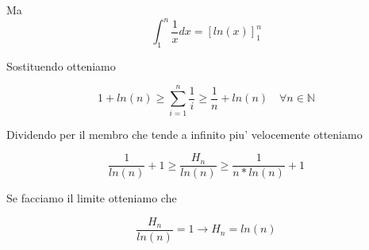 \documentclass{article}
\begin{document}
        Ma
        \begin{equation*}
          \int^n_1 \frac{1}{x}dx=[ln(x)]^n_1
        \end{equation*}
        \begin{flushleft}
          Sostituendo otteniamo 
        \end{flushleft}
        \begin{equation*}
          1+ln(n) \geq \sum_{i=1}^n \frac{1}{i} \geq \frac{1}{n} +ln(n) \quad \forall n \in \mathbb{N}
        \end{equation*}
        \begin{flushleft}
          Dividendo per il membro che tende a infinito piu' velocemente otteniamo
        \end{flushleft}
        \begin{equation*}
          \frac{1}{ln(n)} +1 \geq \frac{H_n}{ln(n)} \geq \frac{1}{n*ln(n)} +1
        \end{equation*}
        \begin{flushleft}
          Se facciamo il limite otteniamo che
        \end{flushleft}
        \begin{equation*}
          \frac{H_n}{ln(n)}=1 \to H_n=ln(n)
        \end{equation*}
\end{document}
